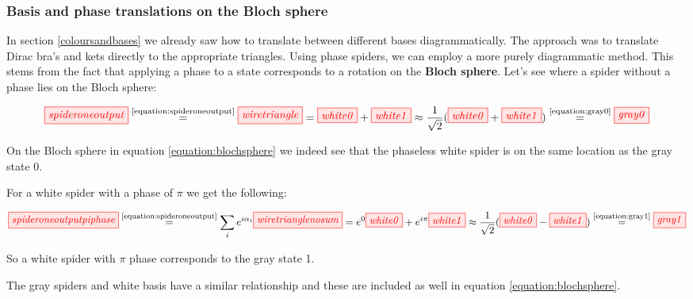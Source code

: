 \documentclass[]{article}
\newcommand{\equaltext}[1]{\ensuremath{\stackrel{\text{#1}}{=}}}
\begin{document}
\subsubsection{Basis and phase translations on the Bloch sphere}
\label{section:basisandphasetranslations}
In section \ref{coloursandbases} we already saw how to translate between different bases diagrammatically. The approach was to translate Dirac bra's and kets directly to the appropriate triangles. Using phase spiders, we can employ a more purely diagrammatic method. This stems from the fact that applying a phase to a state corresponds to a rotation on the \textbf{Bloch sphere}. Let's see where a spider without a phase lies on the Bloch sphere:

\begin{equation}
\tikzfig{spideroneoutput} \equaltext{\ref{equation:spideroneoutput}} \tikzfig{wiretriangle} = \tikzfig{white0} + \tikzfig{white1} \approx \frac{1}{\sqrt{2}}(\tikzfig{white0} + \tikzfig{white1}) \equaltext{\ref{equation:gray0}} \tikzfig{gray0}
\end{equation}

On the Bloch sphere in equation \ref{equation:blochsphere} we indeed see that the phaseless white spider is on the same location as the gray state 0.

For a white spider with a phase of $\pi$ we get the following:

\begin{equation}
\tikzfig{spideroneoutputpiphase} \equaltext{\ref{equation:spideroneoutput}} \sum\limits_{i} e^{i\alpha_i}\tikzfig{wiretrianglenosum} = e^{0}\tikzfig{white0} + e^{i\pi}\tikzfig{white1} \approx \frac{1}{\sqrt{2}}(\tikzfig{white0} - \tikzfig{white1}) \equaltext{\ref{equation:gray1}} \tikzfig{gray1}
\end{equation}

So a white spider with $\pi$ phase corresponds to the gray state 1. 

The gray spiders and white basis have a similar relationship and these are included as well in equation \ref{equation:blochsphere}.
\end{document}
